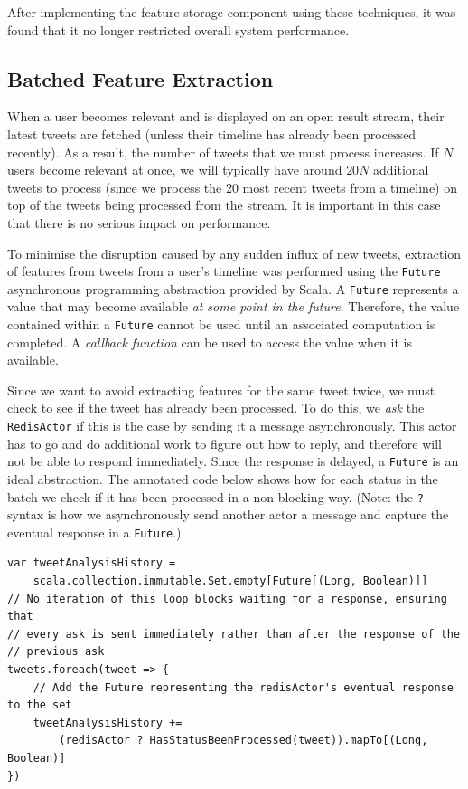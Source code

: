 \documentclass{l4proj}
\newcommand{\code}[1]{\texttt{#1}}
\begin{document}
        
        After implementing the feature storage component using these techniques, it was found that it no longer restricted overall system performance.
        
        \subsection{Batched Feature Extraction}
        When a user becomes relevant and is displayed on an open result stream, their latest tweets are fetched (unless their timeline has already been processed recently). As a result, the number of tweets that we must process increases. If $N$ users become relevant at once, we will typically have around $20N$ additional tweets to process  (since we process the 20 most recent tweets from a timeline) on top of the tweets being processed from the stream. It is important in this case that there is no serious impact on performance.
        
        To minimise the disruption caused by any sudden influx of new tweets, extraction of features from tweets from a user's timeline was performed using the \code{Future} asynchronous programming abstraction provided by Scala. A \code{Future} represents a value that may become available \textit{at some point in the future}. Therefore, the value contained within a \code{Future} cannot be used until an associated computation is completed. A \textit{callback function} can be used to access the value when it is available.
        
        Since we want to avoid extracting features for the same tweet twice, we must check to see if the tweet has already been processed. To do this, we \textit{ask} the \code{RedisActor} if this is the case by sending it a message asynchronously. This actor has to go and do additional work to figure out how to reply, and therefore will not be able to respond immediately. Since the response is delayed, a \code{Future} is an ideal abstraction. The annotated code below shows how for each status in the batch we check if it has been processed in a non-blocking way. (Note: the \code{?} syntax is how we asynchronously send another actor a message and capture the eventual response in a \code{Future}.)
        
\begin{lstlisting}[caption=Check asynchronously whether a status has already been processed.]
var tweetAnalysisHistory = 
    scala.collection.immutable.Set.empty[Future[(Long, Boolean)]]
// No iteration of this loop blocks waiting for a response, ensuring that
// every ask is sent immediately rather than after the response of the 
// previous ask
tweets.foreach(tweet => {
    // Add the Future representing the redisActor's eventual response to the set
    tweetAnalysisHistory += 
        (redisActor ? HasStatusBeenProcessed(tweet)).mapTo[(Long, Boolean)]
})
\end{lstlisting}
        
\end{document}
